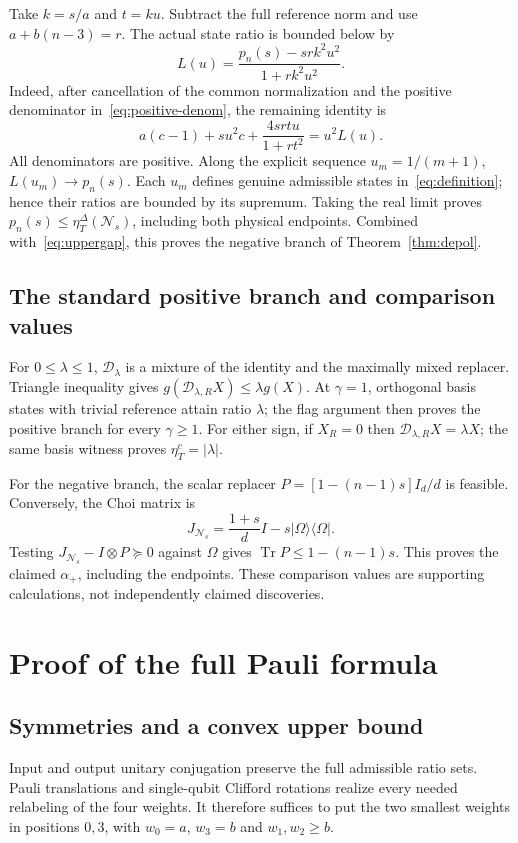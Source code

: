 \documentclass[11pt,a4paper]{article}
\newcommand{\Tr}{\operatorname{Tr}}
\newcommand{\cN}{\mathcal N}
\newcommand{\ket}[1]{\lvert#1\rangle}
\newcommand{\bra}[1]{\langle#1\rvert}
\newcommand{\etatr}{\eta^{\Delta}_T}
\newcommand{\etac}{\eta^{c}_T}
\begin{document}
Take $k=s/a$ and $t=ku$. Subtract the full reference norm and use $a+b(n-3)=r$. The actual state ratio is bounded below by
\begin{equation}\label{eq:rational-ratio}
 L(u)=\frac{p_n(s)-srk^2u^2}{1+rk^2u^2}.
\end{equation}
Indeed, after cancellation of the common normalization and the positive denominator in~\eqref{eq:positive-denom}, the remaining identity is
\[
 a(c-1)+su^2c+\frac{4srtu}{1+rt^2}=u^2L(u).
\]
All denominators are positive. Along the explicit sequence $u_m=1/(m+1)$, $L(u_m)\to p_n(s)$. Each $u_m$ defines genuine admissible states in~\eqref{eq:definition}; hence their ratios are bounded by its supremum. Taking the real limit proves $p_n(s)\le\etatr(\cN_s)$, including both physical endpoints. Combined with~\eqref{eq:uppergap}, this proves the negative branch of Theorem~\ref{thm:depol}.

\subsection{The standard positive branch and comparison values}
For $0\le\lambda\le1$, $\mathcal D_\lambda$ is a mixture of the identity and the maximally mixed replacer. Triangle inequality gives
$g(\mathcal D_{\lambda,R}X)\le\lambda g(X)$. At $\gamma=1$, orthogonal basis states with trivial reference attain ratio $\lambda$; the flag argument then proves the positive branch for every $\gamma\ge1$. For either sign, if $X_R=0$ then $\mathcal D_{\lambda,R}X=\lambda X$; the same basis witness proves $\etac=|\lambda|$.

For the negative branch, the scalar replacer $P=[1-(n-1)s]I_d/d$ is feasible. Conversely, the Choi matrix is
\[
 J_{\cN_s}=\frac{1+s}{d}I-s\ket\Omega\bra\Omega.
\]
Testing $J_{\cN_s}-I\otimes P\succeq0$ against $\Omega$ gives $\Tr P\le1-(n-1)s$. This proves the claimed $\alpha_+$, including the endpoints. These comparison values are supporting calculations, not independently claimed discoveries.

\section{Proof of the full Pauli formula}
\subsection{Symmetries and a convex upper bound}
Input and output unitary conjugation preserve the full admissible ratio sets. Pauli translations and single-qubit Clifford rotations realize every needed relabeling of the four weights. It therefore suffices to put the two smallest weights in positions $0,3$, with $w_0=a$, $w_3=b$ and $w_1,w_2\ge b$.
\end{document}
